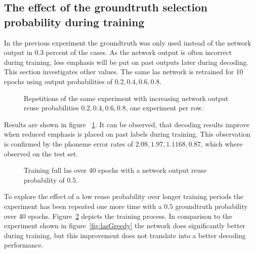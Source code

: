 \subsection{The effect of the groundtruth selection probability during training}
In the previous experiment the groundtruth was only used instead of the network output in 0.3 percent of the cases. As the network output is often incorrect during training, less emphasis will be put on past outputs later during decoding. This section investigates
other values. The same las network is retrained for 10 epochs using output probabilities of $0.2,0.4,0.6,0.8$.
\begin{figure}
\centering








\caption{Repetitions of the same experiment with increasing network output reuse probabilities $0.2, 0.4, 0.6, 0.8$, one experiment per row.}
\label{fig:lasGreedy2468}
\end{figure}
Results are shown in figure ~\ref{fig:lasGreedy2468}. It can be observed, that decoding results improve when reduced emphasis is placed on past labels during training. This observation is confirmed by the phoneme error rates of $2.08, 1.97, 1.1168, 0.87$, which where observed on the test set.
\begin{figure}[h]


\caption{Training full las over 40 epochs with a network output reuse probability of $0.5$.}
\label{fig:lasGreedy05}
\end{figure}
To explore the effect of a low reuse probability over longer training periods the experiment has been repeated one more time with a $0.5$ groundtruth probability over 40 epochs.
Figure~\ref{fig:lasGreedy05} depicts the training process. In comparison to the experiment shown in figure~\ref{fig:lasGreedy} the network does significantly better during training, but
this improvement does not translate into a better decoding performance.

